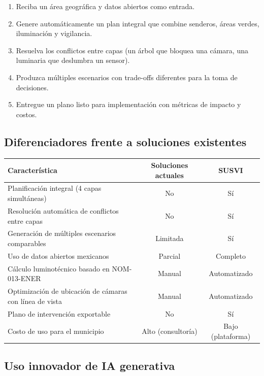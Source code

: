 \documentclass[12pt,a4paper]{article}
\begin{document}
\begin{enumerate}[label=\arabic*.]
    \item Reciba un área geográfica y datos abiertos como entrada.
    \item Genere automáticamente un plan integral que combine senderos, áreas verdes, iluminación y vigilancia.
    \item Resuelva los conflictos entre capas (un árbol que bloquea una cámara, una luminaria que deslumbra un sensor).
    \item Produzca múltiples escenarios con trade-offs diferentes para la toma de decisiones.
    \item Entregue un plano listo para implementación con métricas de impacto y costos.
\end{enumerate}

\subsection{Diferenciadores frente a soluciones existentes}

\begin{table}[H]
\centering
\small
\begin{tabularx}{\textwidth}{X c c}
\toprule
\textbf{Característica} & \textbf{Soluciones actuales} & \textbf{SUSVI} \\
\midrule
Planificación integral (4 capas simultáneas) & No & Sí \\
Resolución automática de conflictos entre capas & No & Sí \\
Generación de múltiples escenarios comparables & Limitada & Sí \\
Uso de datos abiertos mexicanos & Parcial & Completo \\
Cálculo luminotécnico basado en NOM-013-ENER & Manual & Automatizado \\
Optimización de ubicación de cámaras con línea de vista & Manual & Automatizado \\
Plano de intervención exportable & No & Sí \\
Costo de uso para el municipio & Alto (consultoría) & Bajo (plataforma) \\
\bottomrule
\end{tabularx}
\end{table}

\subsection{Uso innovador de IA generativa}
\end{document}
